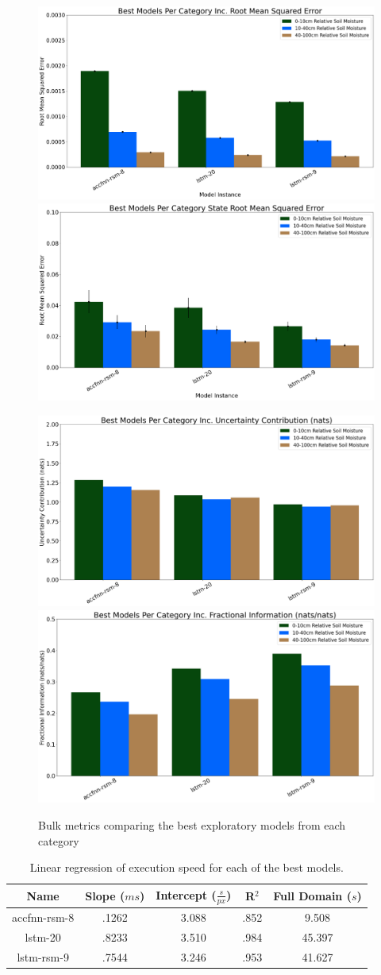 \begin{figure}[hp!]
    \includegraphics[width=.48\linewidth,draft=false]{figures/efficiency_initial-best/eval_test_efficiency_initial-best_mse_res.png}
    \includegraphics[width=.48\linewidth,draft=false]{figures/efficiency_initial-best/eval_test_efficiency_initial-best_mse_state.png}

    \includegraphics[width=.48\linewidth,draft=false]{figures/efficiency_initial-best/eval_test_efficiency_initial-best_info-loss_res.png}
    \includegraphics[width=.48\linewidth,draft=false]{figures/efficiency_initial-best/eval_test_efficiency_initial-best_fi_res.png}

    \caption{Bulk metrics comparing the best exploratory models from each category}
    \label{best-metrics}
\end{figure}

\begin{table}[H]
    \centering
    \begin{tabular}{c|c|c|c|c }
        Name & Slope ($ms$) & Intercept ($\frac{s}{px}$) & R$^2$ & Full Domain ($s$) \\
        \hline
        accfnn-rsm-8 & .1262 & 3.088 & .852 & 9.508 \\
        lstm-20 & .8233 & 3.510 & .984 & 45.397 \\
        lstm-rsm-9 & .7544 & 3.246 & .953 & 41.627 \\
    \end{tabular}
    \caption{Linear regression of execution speed for each of the best models.}
    \label{best-exec-efficiency-table}
\end{table}


